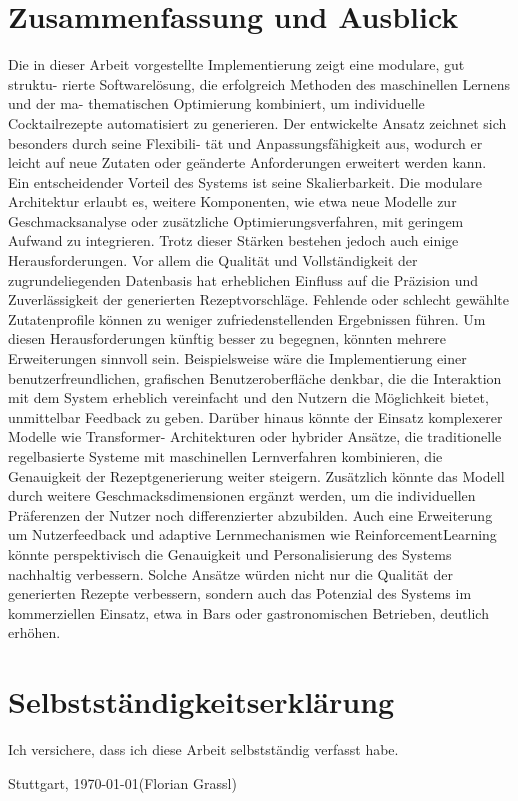 \documentclass[12pt, a4paper]{report}
\begin{document}
\chapter{Zusammenfassung und Ausblick}
Die in dieser Arbeit vorgestellte Implementierung zeigt eine modulare, gut struktu-
rierte Softwarelösung, die erfolgreich Methoden des maschinellen Lernens und der ma-
thematischen Optimierung kombiniert, um individuelle Cocktailrezepte automatisiert
zu generieren. Der entwickelte Ansatz zeichnet sich besonders durch seine Flexibili-
tät und Anpassungsfähigkeit aus, wodurch er leicht auf neue Zutaten oder geänderte
Anforderungen erweitert werden kann.
Ein entscheidender Vorteil des Systems ist seine Skalierbarkeit. Die modulare Architektur erlaubt es, weitere Komponenten, wie etwa neue Modelle zur Geschmacksanalyse
oder zusätzliche Optimierungsverfahren, mit geringem Aufwand zu integrieren. Trotz
dieser Stärken bestehen jedoch auch einige Herausforderungen. Vor allem die Qualität
und Vollständigkeit der zugrundeliegenden Datenbasis hat erheblichen Einfluss auf die
Präzision und Zuverlässigkeit der generierten Rezeptvorschläge. Fehlende oder schlecht
gewählte Zutatenprofile können zu weniger zufriedenstellenden Ergebnissen führen.
Um diesen Herausforderungen künftig besser zu begegnen, könnten mehrere Erweiterungen sinnvoll sein. Beispielsweise wäre die Implementierung einer benutzerfreundlichen, grafischen Benutzeroberfläche denkbar, die die Interaktion mit dem System
erheblich vereinfacht und den Nutzern die Möglichkeit bietet, unmittelbar Feedback
zu geben. Darüber hinaus könnte der Einsatz komplexerer Modelle wie Transformer-
Architekturen oder hybrider Ansätze, die traditionelle regelbasierte Systeme mit maschinellen Lernverfahren kombinieren, die Genauigkeit der Rezeptgenerierung weiter
steigern.
Zusätzlich könnte das Modell durch weitere Geschmacksdimensionen ergänzt werden, um die individuellen Präferenzen der Nutzer noch differenzierter abzubilden. Auch
eine Erweiterung um Nutzerfeedback und adaptive Lernmechanismen wie ReinforcementLearning könnte perspektivisch die Genauigkeit und Personalisierung des Systems
nachhaltig verbessern. Solche Ansätze würden nicht nur die Qualität der generierten
Rezepte verbessern, sondern auch das Potenzial des Systems im kommerziellen Einsatz,
etwa in Bars oder gastronomischen Betrieben, deutlich erhöhen.




\chapter*{Selbstständigkeitserklärung}
Ich versichere, dass ich diese Arbeit selbstständig verfasst habe.

\vspace{2cm}
Stuttgart, \today \hfill (Florian Grassl)
\end{document}
